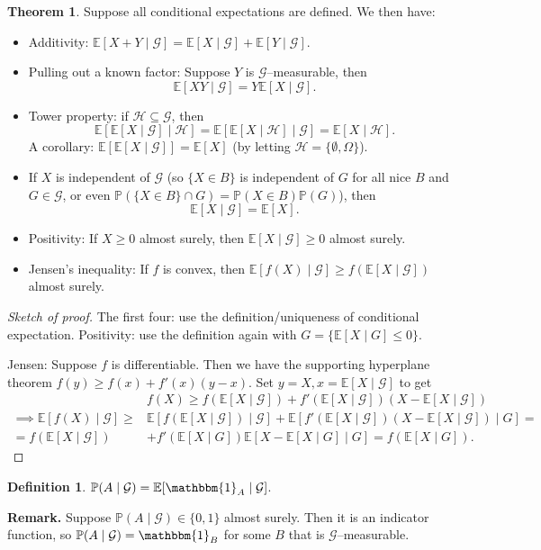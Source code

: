 \documentclass{article}
\theoremstyle{definition}
\newtheorem{theorem}{Theorem}[section]
\newtheorem{defn}{Definition}[section]
\begin{document}
\begin{theorem}
    Suppose all conditional expectations are defined. We then have:
    \begin{itemize}
        \item Additivity: $\mathbb{E}[X+Y \mid \mathcal{G}] = \mathbb{E}[X \mid \mathcal{G}] + \mathbb{E}[Y \mid \mathcal{G}]$.
        \item Pulling out a known factor: Suppose $Y$ is $\mathcal{G}$--measurable, then $$\mathbb{E}[XY \mid \mathcal{G}] = Y \mathbb{E}[X \mid \mathcal{G}].$$
        \item Tower property: if $\mathcal{H} \subseteq \mathcal{G}$, then \[
        \mathbb{E}[\mathbb{E}[X \mid \mathcal{G}] \mid \mathcal{H}] = \mathbb{E}[\mathbb{E}[X \mid \mathcal{H}] \mid \mathcal{G}] = \mathbb{E}[X \mid \mathcal{H}].
        \]
        A corollary: $\mathbb{E}[\mathbb{E}[X \mid \mathcal{G}]] = \mathbb{E}[X]$ (by letting $\mathcal{H}= \{\emptyset,\Omega\}$).
        \item If $X$ is independent of $\mathcal{G}$ (so $\{X \in B\}$ is independent of $G$ for all nice $B$ and $G \in \mathcal{G}$, or even $\mathbb{P}(\{X \in B\} \cap G) = \mathbb{P}(X \in B)\mathbb{P}(G)$), then \[
        \mathbb{E}[X \mid \mathcal{G}] = \mathbb{E}[X].
        \]
        \item Positivity: If $X\ge 0$ almost surely, then $\mathbb{E}[X \mid \mathcal{G}]\ge 0$ almost surely.
        \item Jensen's inequality: If $f$ is convex, then $\mathbb{E}[f(X) \mid \mathcal{G}] \ge f(\mathbb{E}[X \mid \mathcal{G}])$ almost surely.
    \end{itemize}
\end{theorem}
\begin{proof}[Sketch of proof]
    The first four: use the definition/uniqueness of conditional expectation. Positivity: use the definition again with $G = \{\mathbb{E}[X \mid G]\le 0\}$.

    Jensen: Suppose $f$ is differentiable. Then we have the supporting hyperplane theorem $f(y)\ge f(x)+f'(x)(y-x)$. Set $y=X, x= \mathbb{E}[X \mid \mathcal{G}]$ to get 
    \begin{align*}
        &f(X) \ge f(\mathbb{E}[X \mid \mathcal{G}]) + f'(\mathbb{E}[X \mid \mathcal{G}])(X-\mathbb{E}[X\mid \mathcal{G}]) \\
        \implies \mathbb{E}[f(X) \mid \mathcal{G}] \ge& \mathbb{E}[f(\mathbb{E}[X \mid \mathcal{G}])\mid  \mathcal{G}] + \mathbb{E}[f'(\mathbb{E}[X \mid \mathcal{G}])(X-\mathbb{E}[X \mid \mathcal{G}]) \mid G] = \\
        = f(\mathbb{E}[X \mid \mathcal{G}]) &+ f'(\mathbb{E}[X \mid G])\mathbb{E}[X - \mathbb{E}[X \mid G] \mid G] = f(\mathbb{E}[X \mid G]).     
    \end{align*}
\end{proof}
\begin{defn}
    $\mathbb{P}(A \mid \mathcal{G})=\mathbb{E}[\mathbbm{1}_A \mid \mathcal{G}]$.
\end{defn}
\textbf{Remark.} Suppose $\mathbb{P}(A \mid \mathcal{G}) \in \{0,1\}$ almost surely. Then it is an indicator function, so $\mathbb{P}(A \mid \mathcal{G}) = \mathbbm{1}_B$ for some $B$ that is $\mathcal{G}$--measurable.
\end{document}
